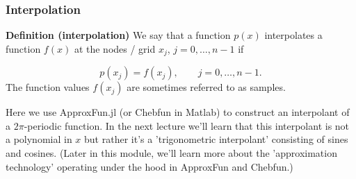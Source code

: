 \documentclass[12pt,landscape]{article}
\begin{document}
{\subsubsection{Interpolation}
\textbf{Definition (interpolation)}  We say that a function $p(x)$ interpolates a function $f(x)$ at the nodes / grid $x_{j}$, $j = 0, \ldots, n-1$ if 

\[
p(x_j) = f(x_j), \qquad j = 0, \ldots, n-1.
\]
The function values $f(x_j)$ are sometimes referred to as samples.

Here we use ApproxFun.jl (or Chebfun in Matlab) to construct an interpolant of a $2\pi$-periodic function.  In the next lecture we'll learn that this interpolant is not a polynomial in $x$ but rather it's a 'trigonometric interpolant' consisting of sines and cosines. (Later in this module, we'll learn more about the 'approximation technology' operating under the hood in ApproxFun and Chebfun.)


}
\end{document}
